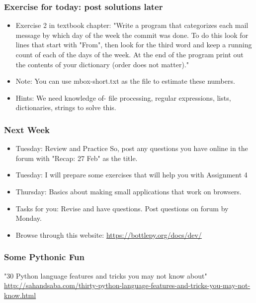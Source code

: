 \documentclass{beamer}
\begin{document}
\begin{frame}
\frametitle{Exercise for today: post solutions later}
\begin{itemize}
\item Exercise 2 in textbook chapter: "Write a program that categorizes each mail message by which day of the week the commit was done. To do this look for lines that start with "From", then look for the third word and keep a running count of each of the days of the week. At the end of the program print out the contents of your dictionary (order does not matter)."
\item Note: You can use mbox-short.txt as the file to estimate these numbers. 
\item Hints: We need knowledge of- file processing, regular expressions, lists, dictionaries, strings to solve this. 
\end{itemize}
\end{frame}

\begin{frame}
\frametitle{Next Week}
\begin{itemize}
\item Tuesday: Review and Practice So, post any questions you have online in the forum with "Recap: 27 Feb" as the title.
\item Tuesday: I will prepare some exercises that will help you with Assignment 4
\item Thursday: Basics about making small applications that work on browsers.
\item Tasks for you: Revise and have questions. Post questions on forum by Monday.
\item Browse through this website: \url{https://bottlepy.org/docs/dev/}
\end{itemize}
\end{frame}

\begin{frame}%
\frametitle{Some Pythonic Fun}
"30 Python language features and tricks you may not know about" \\
\url{http://sahandsaba.com/thirty-python-language-features-and-tricks-you-may-not-know.html}
\end{frame}
\end{document}
